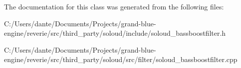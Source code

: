 The documentation for this class was generated from the following files\+:\begin{DoxyCompactItemize}
\item 
C\+:/\+Users/dante/\+Documents/\+Projects/grand-\/blue-\/engine/reverie/src/third\+\_\+party/soloud/include/soloud\+\_\+bassboostfilter.\+h\item 
C\+:/\+Users/dante/\+Documents/\+Projects/grand-\/blue-\/engine/reverie/src/third\+\_\+party/soloud/src/filter/soloud\+\_\+bassboostfilter.\+cpp\end{DoxyCompactItemize}
